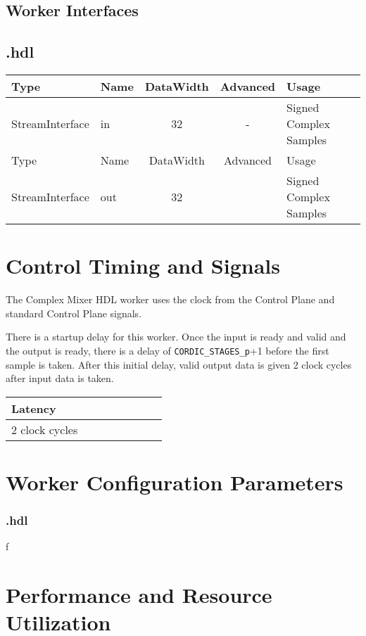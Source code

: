 \begin{landscape}
	\section*{Worker Interfaces}
	\subsection*{\comp.hdl}
	\begin{scriptsize}
		\begin{tabular}{|M{2cm}|M{1.5cm}|c|c|M{12cm}|}
			\hline
			Type            & Name & DataWidth & Advanced  & Usage\\
			\hline
			StreamInterface & in   & 32        & -			& Signed Complex Samples\\
			\hline
			Type            & Name & DataWidth & Advanced	& Usage\\
			\hline
			StreamInterface & out  & 32        & 			& Signed Complex Samples\\
			\hline
		\end{tabular}
	\end{scriptsize}
\end{landscape}

\section*{Control Timing and Signals}
\begin{flushleft}
	The Complex Mixer HDL worker uses the clock from the Control Plane and standard Control Plane signals.\medskip

	There is a startup delay for this worker. Once the input is ready and valid and the output is ready, there is a delay of \verb+CORDIC_STAGES_p++1 before the first sample is taken. After this initial delay, valid output data is given 2 clock cycles after input data is taken.

	\begin{tabular}{|M{4.5cm}|M{1cm}|M{1cm}|M{1.5cm}|M{2cm}|M{1cm}|M{1cm}|M{2.5cm}|}
		\hline
		Latency         \\
		 clock cycles  \\
		\hline
	\end{tabular}
\end{flushleft}

\begin{landscape}
\section*{Worker Configuration Parameters}
\subsubsection*{\comp.hdl}
f
\section*{Performance and Resource Utilization}

\end{landscape}

